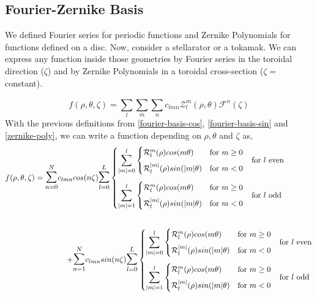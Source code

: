 \subsection{Fourier-Zernike Basis}

We defined Fourier series for periodic functions and Zernike Polynomials for functions defined on a disc. Now, consider a stellarator or a tokamak. We can express any function inside those geometries by Fourier series in the toroidal direction ($\zeta$) and by Zernike Polynomials in a toroidal cross-section ($\zeta = $ constant).

\begin{equation}
    f(\rho,\theta,\zeta) = \sum_{l}^{}\sum_{m}^{}\sum_{n}^{} c_{lmn} \mathcal{Z}_l^m (\rho,\theta) \mathcal{F}^n(\zeta) \label{fourier-zernike-coef}
\end{equation}
With the previous definitions from \ref{fourier-basis-cos}, \ref{fourier-basis-sin} and \ref{zernike-poly}, we can write a function depending on $\rho, \theta$ and $\zeta$ as,
\begin{align}
    f(\rho,\theta,\zeta) =  \mathlarger{\mathlarger{\sum}}_{n=0}^{N}c_{lmn} &cos(n\zeta)\mathlarger{\mathlarger{\sum}}_{l=0}^{L}\begin{cases}
        \mathlarger{\sum}_{|m|=0}^{l} \begin{cases}
            \mathcal{R}_l^{m}(\rho) cos(m\theta) & \text{for } m\geq0 \\[.2cm]
            \mathcal{R}_l^{|m|}(\rho) sin(|m|\theta) & \text{for } m<0
        \end{cases}& \text{for } l \text{ even} \\[.7cm]
        \mathlarger{\sum}_{|m|=1}^{l} \begin{cases}
            \mathcal{R}_l^{m}(\rho) cos(m\theta) & \text{for } m\geq0   \\[.2cm]
            \mathcal{R}_l^{|m|}(\rho) sin(|m|\theta) & \text{for } m<0
        \end{cases}& \text{for } l \text{ odd}
        \end{cases} \\[0.7cm]
        +& \mathlarger{\mathlarger{\sum}}_{n=1}^{N}c_{lmn} sin(n\zeta)\mathlarger{\mathlarger{\sum}}_{l=0}^{L}\begin{cases}
        \mathlarger{\sum}_{|m|=0}^{l} \begin{cases}
            \mathcal{R}_l^{m}(\rho) cos(m\theta) & \text{for } m\geq0 \\[.2cm]
            \mathcal{R}_l^{|m|}(\rho) sin(|m|\theta) & \text{for } m<0
        \end{cases}& \text{for } l \text{ even} \\[.7cm]
        \mathlarger{\sum}_{|m|=1}^{l} \begin{cases}
            \mathcal{R}_l^{m}(\rho) cos(m\theta) & \text{for } m\geq0   \\[.2cm]
            \mathcal{R}_l^{|m|}(\rho) sin(|m|\theta) & \text{for } m<0
        \end{cases}& \text{for } l \text{ odd}
        \end{cases}
\end{align}

